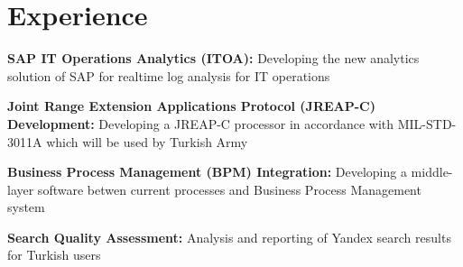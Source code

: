 \section{Experience}


\vspace{\topsep} %
\begin{tightitemize}
  \item \textbf{SAP IT Operations Analytics (ITOA):} Developing the new analytics solution of SAP for realtime log analysis for IT operations
\end{tightitemize}

\sectionspace %



\begin{tightitemize}
\item \textbf{Joint Range Extension Applications Protocol (JREAP-C) Development:} Developing a JREAP-C processor in accordance with MIL-STD-3011A which will be used by Turkish Army
\item \textbf{Business Process Management (BPM) Integration:} Developing a middle-layer software betwen current processes and
Business Process Management system
\end{tightitemize}

\sectionspace %



\begin{tightitemize}
\item \textbf{Search Quality Assessment:} Analysis and reporting of Yandex search results for Turkish users
\end{tightitemize}

\sectionspace %


